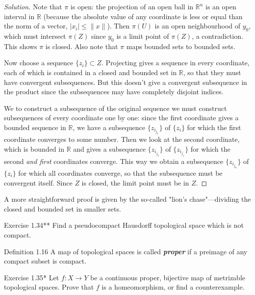 \begin{proof}[Solution]
Note that \(\pi\) is open: the projection of an open ball in \(\mathbb{R}^n\) is an open interval in \(\mathbb{R}\) (because the absolute value of any coordinate is less or equal than the norm of a vector, \(|x_i|\leq \|x\|\)). Then \(\pi(U)\) is an open neighbourhood of \(y_0\), which must intersect \(\pi(Z)\) since \(y_0\) is a limit point of \(\pi(Z)\), a contradiction. This shows \(\pi\) is closed. Also note that \(\pi\) maps bounded sets to bounded sets.

Now choose a sequence $\{z_i\}\subset Z$. Projecting gives a sequence in every coordinate, each of which is contained in a closed and bounded set in \(\mathbb{R}\), so that they must have convergent subsequences. {\color{2}But this doesn't give a convergent subsequence in the product since the subsequences may have completely disjoint indices.}\fi

We to construct a subsequence of the original sequence we must construct subsequences of every coordinate one by one: since the first coordinate gives a bounded sequence in \(\mathbb{R}\), we have a subsequence \(\{z_{i_{j_1}}\}\) of \(\{z_i\}\) for which the first coordinate converges to some number. Then we look at the second coordinate, which is bounded in \(\mathbb{R}\) and gives a subsequence \(\{z_{i_{j_2}}\}\) of \(\{z_{i_{j_1}}\}\) for which the second \textit{and first} coordinates converge. This way we obtain a subsequence \(\{z_{i_{j_n}}\}\) of \(\{z_i\}\) for which all coordinates converge, so that the subsequence must be convergent itself. Since \(Z\) is closed, the limit point must be in \(Z\).
\end{proof}

\begin{remark}\leavevmode
	A more straightforward proof is given by the so-called "lion's chase"---dividing the closed and bounded set in smaller sets.
\end{remark}

\begin{thing4}{Exercise 1.34**}\label{exer:1.34}\leavevmode
Find a pseudocompact Hausdorff topological space which is not compact.
\end{thing4}

\begin{thing3}{Definition 1.16}\leavevmode
A map of topological spaces is called \textit{\textbf{proper}} if a preimage of any compact subset is compact.
\end{thing3}

\begin{thing4}{Exercise 1.35*}\label{exer:1.35}\leavevmode
Let $f:X\to Y$ be a continuous proper, bijective map of metrizable topological spaces. Prove that $f$ is a homeomorphism, or find a counterexample.
\end{thing4}

